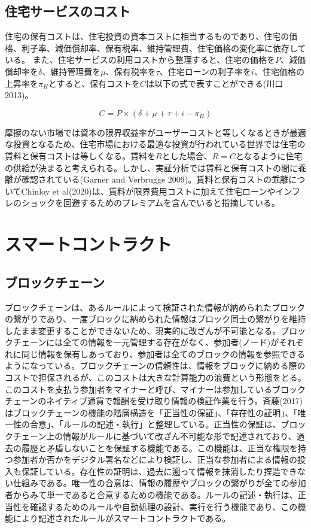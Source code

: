 \documentclass[a4paper,fontsize=11pt,report,notitlepage,line_length=38zw,number_of_lines=40,dvipdfmx]{jlreq}
\begin{document}
\subsection{住宅サービスのコスト}
住宅の保有コストは、住宅投資の資本コストに相当するものであり、住宅の価格、利子率、減価償却率、保有税率、維持管理費、住宅価格の変化率に依存している。
また、住宅サービスの利用コストから整理すると、住宅の価格を$P$、減価償却率を$\delta$、維持管理費を$\mu$、保有税率を$\tau$、住宅ローンの利子率を$i$、住宅価格の上昇率を$\pi_H$とすると、保有コストを$C$は以下の式で表すことができる(川口 2013)\cite{kawaguchi2013}。

\begin{equation}
C=P\times(\delta+\mu+\tau+i-\pi_H)
\end{equation}

摩擦のない市場では資本の限界収益率がユーザーコストと等しくなるときが最適な投資となるため、住宅市場における最適な投資が行われている世界では住宅の賃料と保有コストは等しくなる。賃料を$R$とした場合、$R=C$となるように住宅の供給が決まると考えられる。しかし、実証分析では賃料と保有コストの間に乖離が確認されている(Garner and Verbrugge 2009)\cite{garner2009}。賃料と保有コストの乖離についてChinloy et al(2020)\cite{chinloy2020}は、賃料が限界費用コストに加えて住宅ローンやインフレのショックを回避するためのプレミアムを含んでいると指摘している。

\section{スマートコントラクト}
\subsection{ブロックチェーン}
ブロックチェーンは、あるルールによって検証された情報が納められたブロックの繋がりであり、一度ブロックに納められた情報はブロック同士の繋がりを維持したまま変更することができないため、現実的に改ざんが不可能となる。ブロックチェーンには全ての情報を一元管理する存在がなく、参加者(ノード)がそれぞれに同じ情報を保有しあっており、参加者は全てのブロックの情報を参照できるようになっている。ブロックチェーンの信頼性は、情報をブロックに納める際のコストで担保されるが、このコストは大きな計算能力の浪費という形態をとる。このコストを支払う参加者をマイナーと呼び、マイナーは参加しているブロックチェーンのネイティブ通貨で報酬を受け取り情報の検証作業を行う。斉藤(2017)\cite{saito2017}はブロックチェーンの機能の階層構造を「正当性の保証」、「存在性の証明」、「唯一性の合意」、「ルールの記述・執行」と整理している。正当性の保証は、ブロックチェーン上の情報がルールに基づいて改ざん不可能な形で記述されており、過去の履歴と矛盾しないことを保証する機能である。この機能は、正当な権限を持つ参加者か否かをデジタル署名などにより検証し、正当な参加者による情報の投入も保証している。存在性の証明は、過去に遡って情報を抹消したり捏造できない仕組みである。唯一性の合意は、情報の履歴やブロックの繋がりが全ての参加者からみて単一であると合意するための機能である。ルールの記述・執行は、正当性を確認するためのルールや自動処理の設計、実行を行う機能であり、この機能により記述されたルールがスマートコントラクトである。
\end{document}
